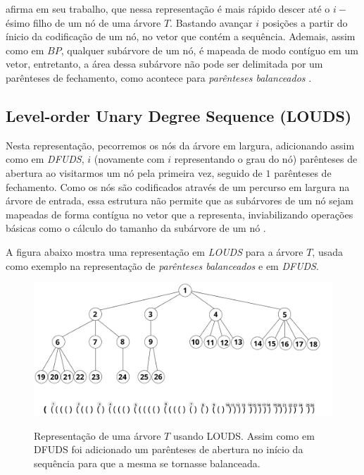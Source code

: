 \citet{book-compact-data-structures} afirma em seu trabalho, que nessa representação é mais  rápido descer até o $i-$ésimo filho de um nó de uma árvore $T$. Bastando avançar  $i$ posições a partir do ínicio da codificação de um nó, no vetor que contém a sequência. Ademais, assim como em $BP$, qualquer subárvore de um nó, é mapeada de modo contíguo em um vetor, entretanto, a área dessa subárvore não pode ser delimitada por um parênteses de fechamento, como acontece para \textit{parênteses balanceados} \citep{book-compact-data-structures}.

\subsection{Level-order Unary Degree Sequence (LOUDS)}
Nesta representação, pecorremos os nós da árvore em largura, adicionando assim como em \textit{DFUDS}, $i$ (novamente com $i$ representando o grau do nó) parênteses de abertura ao visitarmos um nó pela primeira vez, seguido de $1$ parênteses de fechamento.
 Como os nós são codificados através de um percurso em largura na árvore de entrada, essa estrutura não permite que as subárvores de um nó sejam mapeadas de forma contígua no vetor que a representa, inviabilizando operações básicas como o cálculo do tamanho da subárvore de um nó \citep{book-compact-data-structures,paper-fully-functinal-succint-trees}.

A figura abaixo mostra uma representação em \textit{LOUDS} para a árvore $T$, usada como exemplo na representação de \textit{parênteses balanceados} e em \textit{DFUDS}.

\begin{figure}[!ht]
    \centering
      \caption[Representação de árvores com Level-order Unary Degree Sequence]{Representação de uma árvore $T$ usando LOUDS. 
      Assim como em DFUDS foi adicionado um parênteses de abertura no início da sequência  para que a mesma se tornasse balanceada.}
      \includegraphics[width=\columnwidth]{images/louds.png}
      \label{fig:dfudus-representation}
\end{figure}

